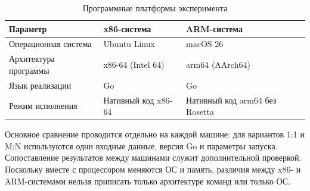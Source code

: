 \begin{table}[htbp]
  \centering
  \caption{Программные платформы эксперимента}
  \label{tab:software-platforms}
  \begin{tabularx}{\textwidth}{|p{3.4cm}|X|X|}
    \hline
    Параметр & x86-система & ARM-система \\
    \hline
    Операционная система & Ubuntu Linux & macOS 26 \\
    \hline
    Архитектура программы & x86-64 (Intel 64) & arm64 (AArch64) \\
    \hline
    Язык реализации & Go & Go \\
    \hline
    Режим исполнения & Нативный код x86-64 & Нативный код arm64 без Rosetta \\
    \hline
  \end{tabularx}
\end{table}

Основное сравнение проводится отдельно на каждой машине: для вариантов 1:1 и M:N используются
  одни входные данные, версия Go и параметры запуска. Сопоставление результатов между машинами
  служит дополнительной проверкой. Поскольку вместе с процессором меняются ОС и память,
  различия между x86- и ARM-системами нельзя приписать только архитектуре команд или только ОС.
